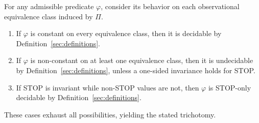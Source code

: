 For any admissible predicate $\varphi$, consider its behavior on each
observational equivalence class induced by $\Pi$.

\begin{enumerate}
\item If $\varphi$ is constant on every equivalence class, then it is
      decidable by Definition~\ref{sec:definitions}.
\item If $\varphi$ is non-constant on at least one equivalence class,
      then it is undecidable by Definition~\ref{sec:definitions},
      unless a one-sided invariance holds for STOP.
\item If STOP is invariant while non-STOP values are not, then
      $\varphi$ is STOP-only decidable by
      Definition~\ref{sec:definitions}.
\end{enumerate}

These cases exhaust all possibilities, yielding the stated trichotomy.
